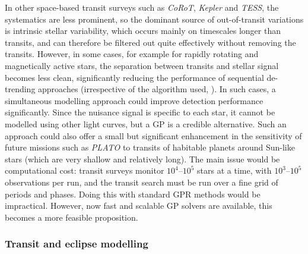 \documentclass[letterpaper]{ar-1col}
\begin{document}
In other space-based transit surveys such as \textit{CoRoT}, \emph{Kepler} and \emph{TESS}, the systematics are less prominent, so the dominant source of out-of-transit variations is intrinsic stellar variability, which occurs mainly on timescales longer than transits, and can therefore be filtered out quite effectively without removing the transits. However, in some cases, for example for rapidly rotating and magnetically active stars, the separation between transits and stellar signal becomes less clean, significantly reducing the performance of sequential de-trending approaches (irrespective of the algorithm used, \citealt{wotan}).
In such cases, a simultaneous modelling approach could improve detection performance significantly. Since the nuisance signal is specific to each star, it cannot be modelled using other light curves, but a GP is a credible alternative. Such an approach could also offer a small but significant enhancement in the sensitivity of future missions such as \textit{PLATO} to transits of habitable planets around Sun-like stars (which are very shallow and relatively long). The main issue would be computational cost: transit surveys monitor $10^4$--$10^5$ stars at a time, with $10^3$--$10^5$ observations per run, and the transit search must be run over a fine grid of periods and phases. Doing this with standard GPR methods would be impractical. However, now fast and scalable GP solvers are available, this becomes a more feasible proposition.

\subsubsection{Transit and eclipse modelling}
\label{sec:transit_fit}
\end{document}
